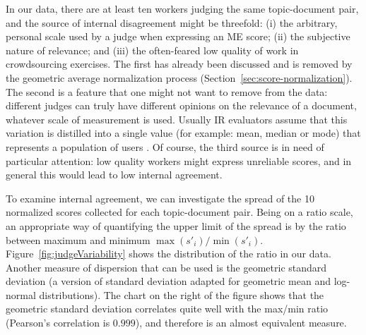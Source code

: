 In our data, there are
at least ten workers judging the same topic-document pair, and
the source of internal disagreement might be threefold:
(i) the arbitrary, personal scale used by a judge when expressing an ME
score; 
(ii) the subjective nature of relevance; and 
(iii) the often-feared low quality of work in crowdsourcing exercises.
The first has already been discussed and is removed by the geometric
average normalization process (Section~\ref{sec:score-normalization}).
The second is a feature that one might not want to remove from the
data: different judges can truly have different opinions on the
relevance of a document, whatever scale of measurement is used.
Usually IR evaluators assume that this variation is distilled into a single 
value (for example: mean, median or mode) 
that represents a population of users .
Of course, the third source is in need of particular attention: low
quality workers might express unreliable scores, and in general this
would lead to low internal agreement.

To examine internal agreement, we can investigate the spread of 
the 10 normalized scores collected for each topic-document pair.
Being on a ratio scale, an appropriate way of quantifying the upper
limit of the spread is
by the ratio between maximum and minimum $\max(s'_i) / \min(s'_i)$.  
Figure~\ref{fig:judgeVariability} 
shows the distribution of the ratio in our data.
Another measure of dispersion that can be used is the geometric
standard deviation (a version of standard deviation adapted for
geometric mean and log-normal distributions). 
The chart on the right of the figure shows that the geometric standard
deviation correlates quite well with the max/min ratio (Pearson's
correlation is $0.999$), and therefore is an almost equivalent
measure. 

